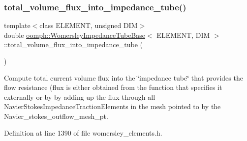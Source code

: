 \mbox{\label{classoomph_1_1WomersleyImpedanceTubeBase_aa321d54eb9f818975854f8f3cc568256}} 
\subsubsection{\texorpdfstring{total\+\_\+volume\+\_\+flux\+\_\+into\+\_\+impedance\+\_\+tube()}{total\_volume\_flux\_into\_impedance\_tube()}}
{\footnotesize\ttfamily template$<$class E\+L\+E\+M\+E\+NT, unsigned D\+IM$>$ \\
double \hyperlink{classoomph_1_1WomersleyImpedanceTubeBase}{oomph\+::\+Womersley\+Impedance\+Tube\+Base}$<$ E\+L\+E\+M\+E\+NT, D\+IM $>$\+::total\+\_\+volume\+\_\+flux\+\_\+into\+\_\+impedance\+\_\+tube (\begin{DoxyParamCaption}{ }\end{DoxyParamCaption})\hspace{0.3cm}{\ttfamily [inline]}}



Compute total current volume flux into the \char`\"{}impedance tube\char`\"{} that provides the flow resistance (flux is either obtained from the function that specifies it externally or by by adding up the flux through all Navier\+Stokes\+Impedance\+Traction\+Elements in the mesh pointed to by the Navier\+\_\+stokes\+\_\+outflow\+\_\+mesh\+\_\+pt. 



Definition at line 1390 of file womersley\+\_\+elements.\+h.

\mbox{\label{classoomph_1_1WomersleyImpedanceTubeBase_a59aa99fe9771f53ee482218da67d87c7}} 
